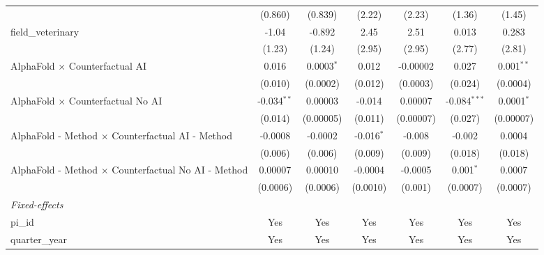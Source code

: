 \begin{tabular}{lcccccc}
                                                               & (0.860)        & (0.839)        & (2.22)         & (2.23)         & (1.36)         & (1.45)\\   
   field\_veterinary                                           & -1.04          & -0.892         & 2.45           & 2.51           & 0.013          & 0.283\\   
                                                               & (1.23)         & (1.24)         & (2.95)         & (2.95)         & (2.77)         & (2.81)\\   
   AlphaFold $\times$ Counterfactual AI                        & 0.016          & 0.0003$^{*}$   & 0.012          & -0.00002       & 0.027          & 0.001$^{**}$\\   
                                                               & (0.010)        & (0.0002)       & (0.012)        & (0.0003)       & (0.024)        & (0.0004)\\   
   AlphaFold $\times$ Counterfactual No AI                     & -0.034$^{**}$  & 0.00003        & -0.014         & 0.00007        & -0.084$^{***}$ & 0.0001$^{*}$\\   
                                                               & (0.014)        & (0.00005)      & (0.011)        & (0.00007)      & (0.027)        & (0.00007)\\   
   AlphaFold - Method $\times$ Counterfactual AI - Method      & -0.0008        & -0.0002        & -0.016$^{*}$   & -0.008         & -0.002         & 0.0004\\   
                                                               & (0.006)        & (0.006)        & (0.009)        & (0.009)        & (0.018)        & (0.018)\\   
   AlphaFold - Method $\times$ Counterfactual No AI - Method   & 0.00007        & 0.00010        & -0.0004        & -0.0005        & 0.001$^{*}$    & 0.0007\\   
                                                               & (0.0006)       & (0.0006)       & (0.0010)       & (0.001)        & (0.0007)       & (0.0007)\\   
   \midrule
   \emph{Fixed-effects}\\
   pi\_id                                                      & Yes            & Yes            & Yes            & Yes            & Yes            & Yes\\  
   quarter\_year                                               & Yes            & Yes            & Yes            & Yes            & Yes            & Yes\\  

\end{tabular}
